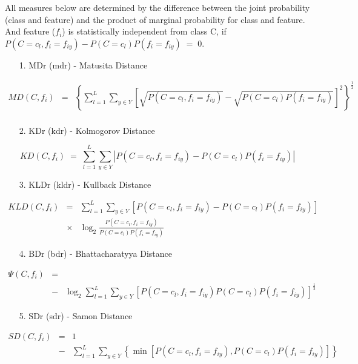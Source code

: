 \documentclass[a4paper,fleqn]{report}
\newcommand\be{\vspace*{1pt}\begin{equation}}
\newcommand\ee{\end{equation}\vspace*{1pt}}
\begin{document}
All measures below are determined by the difference between 
the joint probability (class and feature) and the product of marginal probability for class and feature. And feature ($f_i$) is statistically 
independent from class C, if $P(C=c_l,f_i=f_{iy}) - P(C=c_l)P(f_i=f_{iy}) \;=\; 0 $.
\begin{itemize}
\item[1.] MDr (mdr) - Matusita Distance \cite{Vilmansen1973,Duch2004}
\end{itemize}
\begin{eqnarray}
MD(C,f_i)&=&\left\{ \sum_{l=1}^{L} \sum_{y \in Y} \left[ \sqrt{P(C=c_l,f_i=f_{iy})}  - \sqrt{P(C=c_l)P(f_i=f_{iy})} \right]^{2} \right\}^{\frac{1}{2}} \nonumber \\
        & &
\end{eqnarray}
\begin{itemize}
\item[2.] KDr (kdr) - Kolmogorov Distance \cite{Vilmansen1973,Duch2004}
\end{itemize}
\be
KD(C,f_i)\;=\;\sum_{l=1}^{L} \sum_{y \in Y} \left| P(C=c_l,f_i=f_{iy})  - P(C=c_l)P(f_i=f_{iy}) \right| 
\ee
\begin{itemize}
\item[3.] KLDr (kldr) - Kullback Distance \cite{Vilmansen1973,Duch2004}
\end{itemize}
\begin{eqnarray}
KLD(C,f_i)&=&\sum_{l=1}^{L} \sum_{y \in Y} \left[ P(C=c_l,f_i=f_{iy})  - P(C=c_l)P(f_i=f_{iy}) \right] \nonumber \\
        &\times&\log_{2} \frac{P(C=c_l,f_i=f_{iy})}{P(C=c_l)P(f_i=f_{iy})}  
\end{eqnarray}
\begin{itemize}
\item[4.] BDr (bdr) - Bhattacharatyya Distance \cite{Vilmansen1973,Duch2004}
\end{itemize}
\begin{eqnarray}
\Psi(C,f_i)&=& \\
           &-&\log_{2} \sum_{l=1}^{L} \sum_{y \in Y} \left[ P(C=c_l,f_i=f_{iy}) P(C=c_l)P(f_i=f_{iy}) \right]^{\frac{1}{2}} \nonumber
\end{eqnarray}
\begin{itemize}
\item[5.] SDr (sdr) - Samon Distance \cite{Vilmansen1973,Duch2004}
\end{itemize}
\begin{eqnarray} 
SD(C,f_i)&=&1 \\
        &-& \sum_{l=1}^{L} \sum_{y \in Y} \left\{ \min \left[ P(C=c_l,f_i=f_{iy}),P(C=c_l)P(f_i=f_{iy}) \right]\right\} \nonumber
\end{eqnarray}
\end{document}
